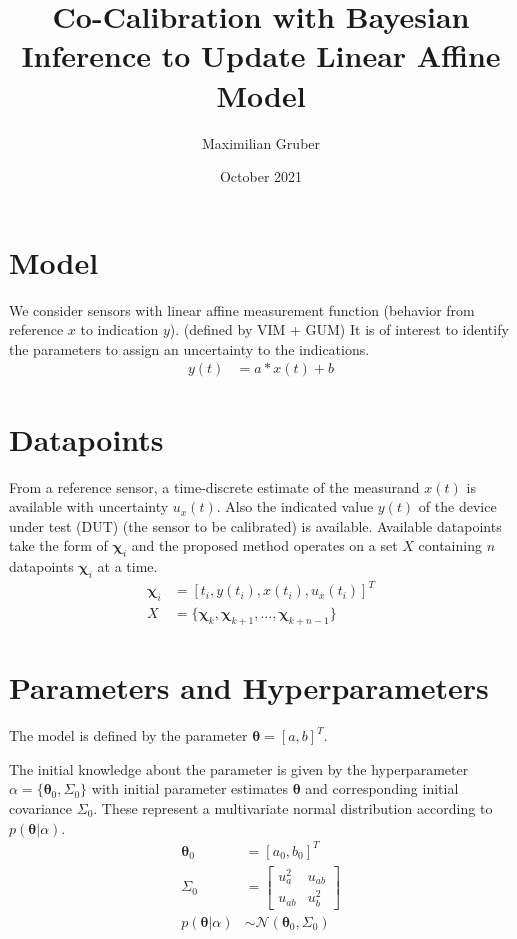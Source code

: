 \documentclass[10pt]{article}
\title{Co-Calibration with Bayesian Inference to Update Linear Affine Model}
\author{Maximilian Gruber}    %
\date{October 2021}
\renewcommand{\vec}[1]{\boldsymbol{#1}}
\newcommand{\mat}[1]{#1}
\begin{document}
    \maketitle
    
    \section{Model}
    We consider sensors with linear affine measurement function (behavior from reference $x$ to indication $y$). (defined by VIM + GUM)
    It is of interest to identify the parameters to assign an uncertainty to the indications.
    \begin{align}
        y(t) &= a*x(t) + b
    \end{align}
    
    \section{Datapoints}
    From a reference sensor, a time-discrete estimate of the measurand $x(t)$ is available with uncertainty $u_x(t)$. 
    Also the indicated value $y(t)$ of the device under test (DUT) (the sensor to be calibrated) is available. 
    Available datapoints take the form of $\vec{\chi}_i$ and the proposed method operates on a set $X$ containing $n$ datapoints $\vec{\chi}_i$ at a time.
    \begin{align}
        \vec{\chi}_i &= [t_i, y(t_i), x(t_i), u_x(t_i)]^T \\
        X &= \{\vec{\chi}_k, \vec{\chi}_{k+1}, \dots,  \vec{\chi}_{k+n-1}\} 
    \end{align}
    
    \section{Parameters and Hyperparameters}
    The model is defined by the parameter $\vec{\theta} = [a, b]^T$. 

    The initial knowledge about the parameter is given by the hyperparameter $\alpha = \{\vec{\theta}_0, \mat{\Sigma}_0\}$ with initial parameter estimates $\vec{\theta}$ and corresponding initial covariance $\mat{\Sigma}_0$.
    These represent a multivariate normal distribution according to $p(\vec{\theta} | \alpha)$.
    \begin{align}
        \vec{\theta}_0 &= [a_0, b_0]^T \\
        \mat{\Sigma}_0 &= \begin{bmatrix}u_a^2 & u_{ab} \\ u_{ab} & u_b^2\end{bmatrix} \\
        p(\vec{\theta} | \alpha) &\sim \mathcal{N}(\vec{\theta}_0, \mat{\Sigma}_0)
    \end{align}
    
\end{document}
